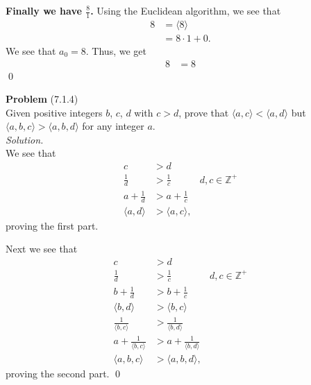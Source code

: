 \documentclass[12 pt]{amsart}
\begin{document}
  \textbf{Finally we have $\frac{8}{1}$.}
  Using the Euclidean algorithm, we see that 
  \begin{align*}
    8 
    &=
      \langle 8 \rangle \\
    &=
      8 \cdot 1 + 0.
  \end{align*}
  We see that $a_0 = 8$.
  Thus, we get
  \begin{align*}
    8 &= 8
  \end{align*}
  \qed 
\vfill
\newpage



\phantom{\quad} \vfill
\noindent
\textbf{Problem} (7.1.4) \\[4ex]
  Given positive integers $b$, $c$, $d$ with 
  $c > d$, prove that 
  $\langle a,c \rangle < \langle a, d \rangle$ but
  $\langle a,b,c \rangle > \langle a,b, d \rangle$
  for any integer $a$.
  \\[2ex]
\emph{Solution.} \\[2ex]
  We see that 
  \begin{align*}
    c &> d \\
    \frac{1}{d} &> \frac{1}{c} & d,c \in \mathbb{Z}^+\\
    a + \frac{1}{d} &> a + \frac{1}{c} \\
    \langle a,d \rangle &> \langle a, c \rangle,
  \end{align*}
  proving the first part.

  Next we see that 
  \begin{align*}
    c &> d \\
    \frac{1}{d} &> \frac{1}{c} & d,c \in \mathbb{Z}^+ \\
    b + \frac{1}{d} &> b + \frac{1}{c} \\
    \langle b,d \rangle &> \langle b, c \rangle \\
    \frac{1}{\langle b,c \rangle} &> \frac{1}{\langle b, d \rangle} \\
    a + \frac{1}{\langle b,c \rangle} &> a + \frac{1}{\langle b, d \rangle} \\
    \langle a,b,c \rangle &> \langle a,b, d \rangle,
  \end{align*}
  proving the second part.
  \qed
\vfill
\newpage
\end{document}
